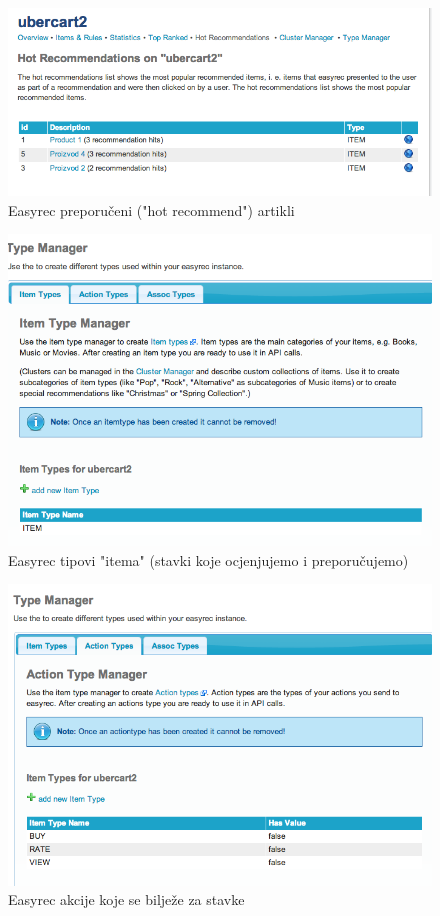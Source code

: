 \documentclass[times, utf8, seminar]{fit}
\begin{document}
{{{\begin{figure}[H]
\centering
\includegraphics[width=12cm]{img/easyrec_5_hot_recommend.png}
\caption{Easyrec preporučeni ("hot recommend") artikli}
\end{figure}

\begin{figure}[H]
\centering
\includegraphics[width=12cm]{img/easyrec_6_item_types.png}
\caption{Easyrec tipovi "itema" (stavki koje ocjenjujemo i preporučujemo) }
\end{figure}

\begin{figure}[H]
\centering
\includegraphics[width=12cm]{img/easyrec_7_item_actions.png}
\caption{Easyrec akcije koje se bilježe za stavke}
\end{figure}

}}}
\end{document}

